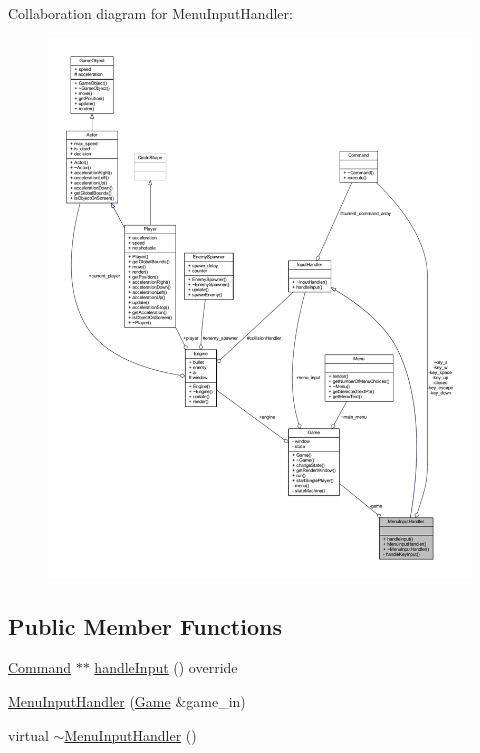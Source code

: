 Collaboration diagram for Menu\+Input\+Handler\+:
\nopagebreak
\begin{figure}[H]
\begin{center}
\leavevmode
\includegraphics[width=350pt]{class_menu_input_handler__coll__graph}
\end{center}
\end{figure}
\subsection*{Public Member Functions}
\begin{DoxyCompactItemize}
\item 
\hyperlink{class_command}{Command} $\ast$$\ast$ \hyperlink{class_menu_input_handler_a60840342f557c79f31097aa713ba7a37}{handle\+Input} () override
\item 
\hyperlink{class_menu_input_handler_ae0a666273bb8b76cea8352e600b987fc}{Menu\+Input\+Handler} (\hyperlink{class_game}{Game} \&game\+\_\+in)
\item 
virtual \hyperlink{class_menu_input_handler_aad61207bccc58ff8c688ffb265ca13db}{$\sim$\+Menu\+Input\+Handler} ()
\end{DoxyCompactItemize}
